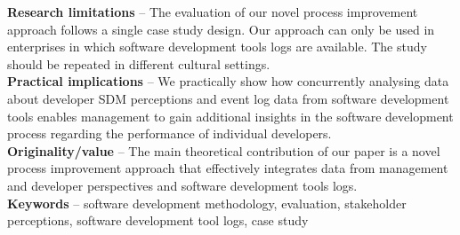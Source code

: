 \noindent
\textbf{Research limitations} – The evaluation of our novel process improvement approach follows a single case study design. Our approach can only be used in enterprises in which software development tools logs are available. The study should be repeated in different cultural settings. \\

\noindent
\textbf{Practical implications} – We practically show how concurrently analysing data about developer SDM perceptions and event log data from software development tools enables management to gain additional insights in the software development process regarding the performance of individual developers. \\

\noindent
\textbf{Originality/value} – The main theoretical contribution of our paper is a novel process improvement approach that effectively integrates data from management and developer perspectives and software development tools logs. \\

\noindent
\textbf{Keywords} – software development methodology, evaluation, stakeholder perceptions, software development tool logs, case study

\pagebreak



% 
%
%
%

%

%


%